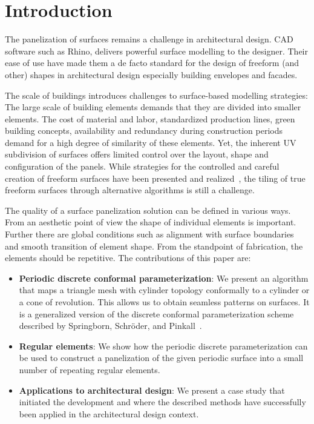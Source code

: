 \documentclass[Thesis.tex]{subfiles}
\begin{document}
\section{Introduction}
\label{sec:introduction}

The panelization of surfaces remains a challenge in architectural
design. CAD software such as Rhino, delivers powerful \nurbs surface
modelling to the designer. Their ease of use have made them a de facto
standard for the design of freeform (and other) shapes in
architectural design especially building envelopes and facades.  

The scale of buildings introduces challenges to surface-based
modelling strategies: The large scale of building elements demands
that they are divided into smaller elements. The cost of material and
labor, standardized production lines, green building concepts,
availability and redundancy during construction periods demand for a
high degree of similarity of these elements. Yet, the inherent
UV subdivision of \nurbs surfaces offers limited control over the
layout, shape and configuration of the panels. While strategies for
the controlled and careful creation of freeform surfaces have been
presented and realized~\cite{GlymphSCMS2004}, the tiling of true
freeform surfaces through alternative algorithms is still a challenge.

The quality of a surface panelization solution can be defined in
various ways. From an aesthetic point of view the shape of individual
elements is important. Further there are global conditions such as
alignment with surface boundaries and smooth transition of element
shape. From the standpoint of fabrication, the elements should be
repetitive. The contributions of this paper are:

\begin{itemize}
\item {\bf Periodic discrete conformal parameterization}:
  We present an algorithm that maps a triangle mesh with cylinder
  topology conformally to a cylinder or a cone of revolution. This
  allows us to obtain seamless patterns on surfaces. It is a
  generalized version of the discrete conformal parameterization
  scheme described by Springborn, Schr\"{o}der, and Pinkall~\cite{Springborn2008}.
\item {\bf Regular elements}:
  We show how the periodic discrete parameterization can be used to
  construct a panelization of the given periodic surface into a small
  number of repeating regular elements.
\item {\bf Applications to architectural design}: 
  We present a case study that initiated the development and where the
  described methods have successfully been applied in the architectural design
  context.
\end{itemize}
\end{document}
